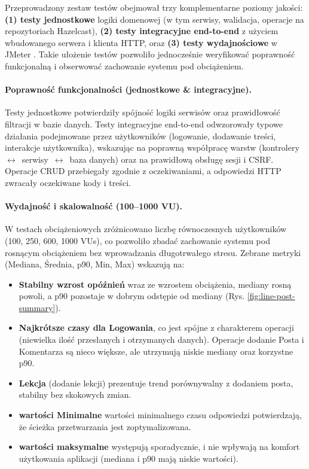 Przeprowadzony zestaw testów obejmował trzy komplementarne poziomy jakości:
\textbf{(1) testy jednostkowe} logiki domenowej (w tym serwisy, walidacja, operacje na repozytoriach Hazelcast),
\textbf{(2) testy integracyjne end-to-end} z użyciem wbudowanego serwera i klienta HTTP,
oraz \textbf{(3) testy wydajnościowe} w JMeter \cite{jmeter-docs}.
Takie ułożenie testów pozwoliło jednocześnie weryfikować poprawność funkcjonalną
i obserwować zachowanie systemu pod obciążeniem.

\paragraph{Poprawność funkcjonalności (jednostkowe \& integracyjne).}
Testy jednostkowe potwierdziły spójność logiki serwisów oraz prawidłowość filtracji w bazie danych.
Testy integracyjne end-to-end odwzorowały typowe działania podejmowane przez użytkowników (logowanie, dodawanie treści, interakcje użytkownika),
wskazując na poprawną współpracę warstw (kontrolery~$\leftrightarrow$~serwisy~$\leftrightarrow$~baza danych) oraz
na prawidłową obsługę sesji i CSRF. Operacje CRUD przebiegały zgodnie z oczekiwaniami, a odpowiedzi HTTP
zwracały oczekiwane kody i treści.

\paragraph{Wydajność i skalowalność (100--1000 VU).}
W testach obciążeniowych zróżnicowano liczbę równoczesnych użytkowników (100, 250, 600, 1000 VUs),
co pozwoliło zbadać zachowanie systemu pod rosnącym obciążeniem bez wprowadzania długotrwałego stresu.
Zebrane metryki (Mediana, Średnia, p90, Min, Max) wskazują na:
\begin{itemize}
  \item \textbf{Stabilny wzrost opóźnień} wraz ze wzrostem obciążenia, mediany rosną powoli,
        a p90 pozostaje w dobrym odstępie od mediany (Rys. \ref{fig:line-post-summary}).
  \item \textbf{Najkrótsze czasy dla Logowania}, co jest spójne z charakterem operacji (niewielka ilość przesłanych i otrzymanych danych).
        Operacje dodanie Posta i Komentarza są nieco większe, ale utrzymują niskie mediany oraz korzystne p90.
  \item \textbf{Lekcja} (dodanie lekcji) prezentuje trend porównywalny z dodaniem posta, stabilny bez skokowych zmian.
  \item \textbf{wartości Minimalne} wartości minimalnego czasu odpowiedzi potwierdzają, że ścieżka przetwarzania jest zoptymalizowana.
\item \textbf{wartości maksymalne} występują  sporadycznie, i nie wpływają na komfort użytkowania aplikacji
        (mediana i p90 mają niskie wartości).
\end{itemize}

